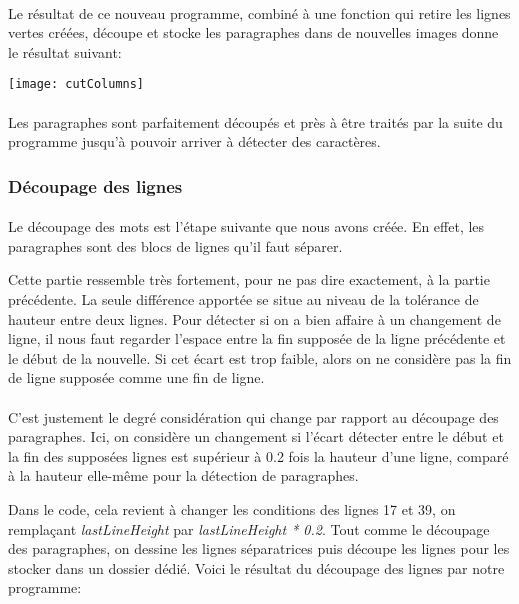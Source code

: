 \documentclass{article}
\begin{document}
	\paragraph{}
	Le résultat de ce nouveau programme, combiné à une fonction qui retire les lignes vertes créées, découpe et stocke les paragraphes dans de nouvelles images donne le résultat suivant: 
	
	\begin{center}
		\texttt{[image: cutColumns]}
	\end{center}
	
	\paragraph{}
	Les paragraphes sont parfaitement découpés et près à être traités par la suite du programme jusqu'à pouvoir arriver à détecter des caractères.
	
	\subsubsection{Découpage des lignes}
	\paragraph{}
	Le découpage des mots est l'étape suivante que nous avons créée. En effet, les paragraphes sont des blocs de lignes qu'il faut séparer.
	\par Cette partie ressemble très fortement, pour ne pas dire exactement, à la partie précédente. La seule différence apportée se situe au niveau de la tolérance de hauteur entre deux lignes. Pour détecter si on a bien affaire à un changement de ligne, il nous faut regarder l'espace entre la fin supposée de la ligne précédente et le début de la nouvelle. Si cet écart est trop faible, alors on ne considère pas la fin de ligne supposée comme une fin de ligne.
	
	\paragraph{}
	C'est justement le degré considération qui change par rapport au découpage des paragraphes. Ici, on considère un changement si l'écart détecter entre le début et la fin des supposées lignes est supérieur à 0.2 fois la hauteur d'une ligne, comparé à la hauteur elle-même pour la détection de paragraphes.
	\par Dans le code, cela revient à changer les conditions des lignes 17 et 39, on remplaçant \textit{lastLineHeight} par \textit{lastLineHeight * 0.2}. Tout comme le découpage des paragraphes, on dessine les lignes séparatrices puis découpe les lignes pour les stocker dans un dossier dédié. Voici le résultat du découpage des lignes par notre programme: \\
	
\end{document}
